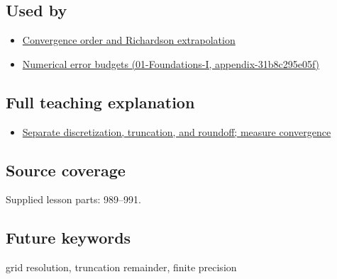\subsection{Used by}\label{appendix-6b0648b2b8e8-used-by}

\begin{itemize}
\tightlist
\item
  \hyperref[appendix-aca80b6bf17a]{Convergence order and Richardson extrapolation}
\item
  \href{../01-Foundations-I/main.pdf\#nameddest=appendix-31b8c295e05f}{Numerical error budgets (01-Foundations-I, appendix-31b8c295e05f)}
\end{itemize}

\subsection{Full teaching explanation}\label{appendix-6b0648b2b8e8-full-teaching-explanation}

\begin{itemize}
\tightlist
\item
  \hyperref[02-foundations-ii-ch029-separate-discretization-truncation-and-roundoff-measure-convergence]{Separate discretization, truncation, and roundoff; measure convergence}
\end{itemize}

\subsection{Source coverage}\label{appendix-6b0648b2b8e8-source-coverage}

Supplied lesson parts: 989--991.

\subsection{Future keywords}\label{appendix-6b0648b2b8e8-future-keywords}

grid resolution, truncation remainder, finite precision
